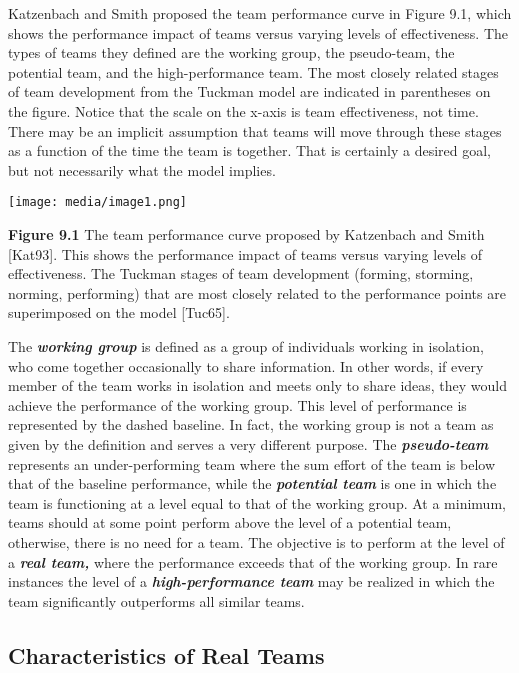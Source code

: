 Katzenbach and Smith proposed the team performance curve in Figure 9.1,
which shows the performance impact of teams versus varying levels of
effectiveness. The types of teams they defined are the working group,
the pseudo-team, the potential team, and the high-performance team. The
most closely related stages of team development from the Tuckman model
are indicated in parentheses on the figure. Notice that the scale on the
x-axis is team effectiveness, not time. There may be an implicit
assumption that teams will move through these stages as a function of
the time the team is together. That is certainly a desired goal, but not
necessarily what the model implies.

\texttt{[image: media/image1.png]}

\textbf{Figure 9.1} The team performance curve proposed by Katzenbach
and Smith {[}Kat93{]}. This shows the performance impact of teams versus
varying levels of effectiveness. The Tuckman stages of team development
(forming, storming, norming, performing) that are most closely related
to the performance points are superimposed on the model {[}Tuc65{]}.

The \emph{\textbf{working group}} is defined as a group of individuals
working in isolation, who come together occasionally to share
information. In other words, if every member of the team works in
isolation and meets only to share ideas, they would achieve the
performance of the working group. This level of performance is
represented by the dashed baseline. In fact, the working group is not a
team as given by the definition and serves a very different purpose. The
\emph{\textbf{pseudo-team}} represents an under-performing team where
the sum effort of the team is below that of the baseline performance,
while the \emph{\textbf{potential team}} is one in which the team is
functioning at a level equal to that of the working group. At a minimum,
teams should at some point perform above the level of a potential team,
otherwise, there is no need for a team. The objective is to perform at
the level of a \emph{\textbf{real team,}} where the performance exceeds
that of the working group. In rare instances the level of a
\emph{\textbf{high-performance team}} may be realized in which the team
significantly outperforms all similar teams.

\subsection{Characteristics of Real
Teams}\label{characteristics-of-real-teams}

